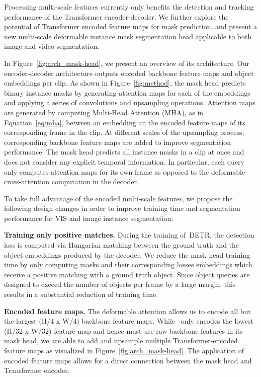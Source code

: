 \documentclass[runningheads]{llncs}
\newcommand{\detr}{\mbox{DETR}}
\begin{document}
Processing multi-scale features currently only benefits the detection and tracking performance of the Transformer encoder-decoder.
We further explore the potential of Transformer encoded feature maps for mask prediction, and present a new multi-scale deformable instance mask segmentation head applicable to both image and video segmentation.





In Figure~\ref{fig:arch_mask-head}, we present an overview of its architecture.
Our encoder-decoder architecture outputs encoded backbone feature maps and object embeddings per clip.
As shown in Figure~\ref{fig:method}, the mask head predicts binary instance masks by generating attention maps for each of the embeddings and applying a series of convolutions and upsampling operations.
Attention maps are generated by computing Multi-Head Attention (MHA), as in Equation~\ref{eq:mha}, between an embedding an the encoded feature maps of its corresponding frame in the clip.
At different scales of the upsampling process, corresponding backbone feature maps are added to improve segmentation performance.
The mask head predicts all instance masks in a clip at once and does not consider any explicit temporal information. 
In particular, each query only computes attention maps for its own frame as opposed to the deformable cross-attention computation in the decoder.

To take full advantage of the encoded multi-scale features, we propose the following design changes in order to improve training time and segmentation performance for VIS and image instance segmentation: 

\noindent \textbf{Training only positive matches.}
During the training of~\detr{}, the detection loss is computed via Hungarian matching between the ground truth and the object embeddings produced by the decoder.
We reduce the mask head training time by only computing masks and their corresponding losses embeddings which receive a positive matching with a ground truth object.
Since object queries are designed to exceed the number of objects per frame by a large margin, this results in a substantial reduction of training time.

\noindent \textbf{Encoded feature maps.}
The deformable attention allows us to encode all but the largest (H/4 x W/4) backbone feature maps.
While~\cite{DETR} only encodes the lowest (H/32 x W/32) feature map and hence must use raw backbone features in its mask head, we are able to add and upsample multiple Transformer-encoded feature maps as visualized in Figure~\ref{fig:arch_mask-head}.
The application of encoded feature maps allows for a direct connection between the mask head and Transformer encoder.
\end{document}
